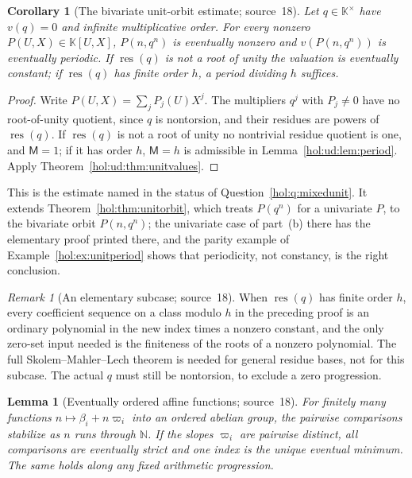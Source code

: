 \documentclass[11pt]{article}
\numberwithin{equation}{section}
\newtheorem{lemma}[theorem]{Lemma}
\newtheorem{corollary}[theorem]{Corollary}
\theoremstyle{definition}
\theoremstyle{remark}
\newtheorem{remark}[theorem]{Remark}
\newcommand{\N}{\mathbb N}
\newcommand{\res}{\operatorname{res}}
\newcommand{\KK}{\mathbb K}
\begin{document}
\begin{corollary}[The bivariate unit-orbit estimate; source~18]
\label{hol:ud:cor:bivariate}
Let $q\in\KK^\times$ have $v(q)=0$ and infinite multiplicative order. For every
nonzero $P(U,X)\in\KK[U,X]$, $P(n,q^n)$ is eventually nonzero and
$v(P(n,q^n))$ is eventually periodic. If $\res(q)$ is not a root of unity the
valuation is eventually constant; if $\res(q)$ has finite order $h$, a period
dividing $h$ suffices.
\end{corollary}

\begin{proof}
Write $P(U,X)=\sum_jP_j(U)X^j$. The multipliers $q^j$ with $P_j\ne0$ have no
root-of-unity quotient, since $q$ is nontorsion, and their residues are powers
of $\res(q)$. If $\res(q)$ is not a root of unity no nontrivial residue
quotient is one, and $\mathsf M=1$; if it has order $h$, $\mathsf M=h$ is
admissible in Lemma~\ref{hol:ud:lem:period}. Apply
Theorem~\ref{hol:ud:thm:unitvalues}.
\end{proof}

This is the estimate named in the status of Question~\ref{hol:q:mixedunit}.
It extends Theorem~\ref{hol:thm:unitorbit}, which treats $P(q^n)$ for a
univariate $P$, to the bivariate orbit $P(n,q^n)$; the univariate case of
part~(b) there has the elementary proof printed there, and the parity example
of Example~\ref{hol:ex:unitperiod} shows that periodicity, not constancy, is
the right conclusion.

\begin{remark}[An elementary subcase; source~18]
\label{hol:ud:rem:elementary}
When $\res(q)$ has finite order $h$, every coefficient sequence on a class
modulo $h$ in the preceding proof is an ordinary polynomial in the new index
times a nonzero constant, and the only zero-set input needed is the
finiteness of the roots of a nonzero polynomial. The full
Skolem--Mahler--Lech theorem is needed for general residue bases, not for this
subcase. The actual $q$ must still be nontorsion, to exclude a zero
progression.
\end{remark}

\begin{lemma}[Eventually ordered affine functions; source~18]
\label{hol:ud:lem:lines}
For finitely many functions $n\mapsto\beta_i+n\varpi_i$ into an ordered abelian
group, the pairwise comparisons stabilize as $n$ runs through $\N$. If the
slopes $\varpi_i$ are pairwise distinct, all comparisons are eventually strict
and one index is the unique eventual minimum. The same holds along any fixed
arithmetic progression.
\end{lemma}
\end{document}

